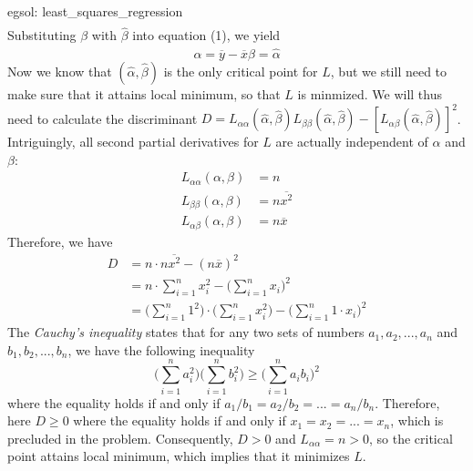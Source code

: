 \begin{egsol}[]{egsol: least_squares_regression}
\begin{align*}
    \end{align*}
    Substituting $\beta$ with $\hat{\beta}$ into equation (1), we yield
    \[\alpha = \overline{y} - \overline{x}\hat{\beta} = \hat{\alpha}\]
    Now we know that $(\hat{\alpha}, \hat{\beta})$ is the only critical point for $L$, but we still need to make sure that it attains local minimum, so that $L$ is minmized.  We will thus need to calculate the discriminant $D = L_{\alpha\alpha}(\hat{\alpha}, \hat{\beta})L_{\beta\beta}(\hat{\alpha}, \hat{\beta}) - [L_{\alpha\beta}(\hat{\alpha}, \hat{\beta})]^2$.  Intriguingly, all second partial derivatives for $L$ are actually independent of $\alpha$ and $\beta$:
    \begin{align*}
        L_{\alpha\alpha}(\alpha, \beta) &= n\\
        L_{\beta\beta}(\alpha, \beta) &= n\overline{x^2}\\
        L_{\alpha\beta}(\alpha, \beta) &= n\overline{x}
    \end{align*}
    Therefore, we have
    \begin{align*}
        D &= n \cdot n \overline{x^2} - (n\overline{x})^2\\
        &= n \cdot \sum_{i=1}^n x_i^2 - \Big(\sum_{i=1}^n x_i\Big)^2\\
        &=  \Big(\sum_{i=1}^n 1^2\Big) \cdot \Big(\sum_{i=1}^n x_i^2\Big) - \Big(\sum_{i=1}^n 1 \cdot x_i\Big)^2
    \end{align*}
    The \textit{Cauchy's inequality} states that for any two sets of numbers $a_1, a_2, ..., a_n$ and $b_1, b_2, ..., b_n$, we have the following inequality
    \[\Big(\sum_{i=1}^n a_i^2\Big)\Big(\sum_{i=1}^n b_i^2\Big) \ge \Big(\sum_{i=1}^n a_i b_i\Big)^2\]
    where the equality holds if and only if $a_1/b_1 = a_2/b_2 = ... = a_n/b_n$.  Therefore, here $D \ge 0$ where the equality holds if and only if $x_1 = x_2 = ... = x_n$, which is precluded in the problem.  Consequently, $D > 0$ and $L_{\alpha\alpha} = n > 0$, so the critical point attains local minimum, which implies that it minimizes $L$.
\end{egsol}

